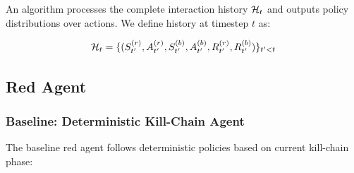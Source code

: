 \documentclass[12pt,twoside]{article}
\newcounter{phase}[algorithm]
\theoremstyle{definition}
\theoremstyle{plain}
\begin{document}
An algorithm processes the complete interaction history $\mathcal{H}_t$ and outputs policy distributions over actions. We define history at timestep $t$ as:

\begin{equation}
\mathcal{H}_t = \{(S_{t'}^{(r)}, A_{t'}^{(r)}, S_{t'}^{(b)}, A_{t'}^{(b)}, R_{t'}^{(r)}, R_{t'}^{(b)})\}_{t' < t}
\end{equation}

\subsection{Red Agent}

\subsubsection{Baseline: Deterministic Kill-Chain Agent}
The baseline red agent follows deterministic policies based on current kill-chain phase:
\end{document}
